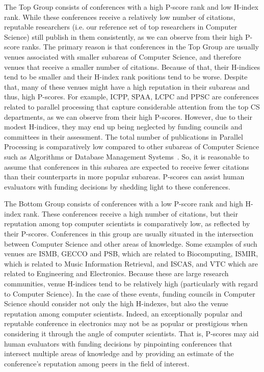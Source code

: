 \documentclass[man]{apa6}
\let \cite \parencite
\begin{document}
The Top Group consists of conferences with a high P-score rank and low H-index rank. While these conferences
receive a relatively low number of citations, reputable researchers (i.e. our reference set of top researchers in Computer Science) still publish 
in them consistently, as we can observe from their high P-score ranks. The primary reason is that
conferences in the Top Group are usually venues associated with smaller subareas of Computer Science, and therefore venues that receive a smaller
number of citations. Because of that, their H-indices tend to be smaller and their H-index rank positions tend to be worse. Despite that, many of these venues might have a high reputation in their subareas and thus, high P-scores. 
For example, ICPP, SPAA, LCPC and PPSC are conferences related to parallel processing that capture
considerable attention from the top CS departments, as we can observe from their high P-scores. However,
due to their modest H-indices, they may end up being neglected by funding councils and committees in
their assessment. The total number of publications in Parallel Processing is comparatively low 
compared to other subareas of Computer Science such as Algorithms or Database Management Systems~\cite{Hoonlor2013}. So, it is reasonable to assume that conferences 
in this subarea are expected to receive fewer citations than their counterparts in more popular subareas.
P-scores can assist human evaluators with funding decisions by shedding light to these conferences.

The Bottom Group consists of conferences with a low P-score rank and high H-index rank. These conferences
receive a high number of citations, but their reputation among top computer scientists is comparatively low, as reflected by their P-scores. Conferences in this
group are usually situated in the intersection between Computer Science and other areas of knowledge. Some examples of such venues are
ISMB, GECCO and PSB, which are related to Biocomputing, ISMIR, which is related to Music Information Retrieval, and
ISCAS, and VTC which are related to Engineering and Electronics. Because these are large research communities, venue H-indices tend to be 
relatively high (particularly with regard to Computer Science). In the case of these events, funding councils in Computer Science should consider not only the high H-indexes, but also the venue reputation among computer
scientists. Indeed, an exceptionally popular and reputable conference in electronics may not be as 
popular or prestigious when considering it through the angle of computer scientists. That is, P-scores may aid 
human evaluators with funding decisions by pinpointing conferences that intersect multiple areas of knowledge and by providing
an estimate of the conference's reputation among peers in the field of interest.
\end{document}
